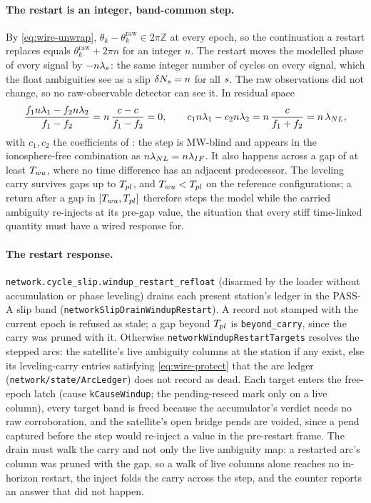 \documentclass[main.tex]{subfiles}
\begin{document}
\paragraph{The restart is an integer, band-common step.}
By \eqref{eq:wire-unwrap}, $\theta_k - \theta^{\mathrm{raw}}_k \in
2\pi\mathbb{Z}$ at every epoch, so the continuation a restart replaces
equals $\theta^{\mathrm{raw}}_k + 2\pi n$ for an integer $n$. The restart
moves the modelled phase of every signal by $-n\lambda_s$: the same
integer number of cycles on every signal, which the float ambiguities see
as a slip $\delta N_s = n$ for all $s$. The raw observations did
not change, so no raw-observable detector can see it. In residual space
\begin{equation}
\frac{f_1 n\lambda_1 - f_2 n\lambda_2}{f_1 - f_2}
= n\,\frac{c - c}{f_1 - f_2} = 0,
\qquad
c_1 n\lambda_1 - c_2 n\lambda_2 = n\,\frac{c}{f_1+f_2} = n\,\lambda_{NL} ,
\label{eq:wire-mw-blind}
\end{equation}
with $c_1, c_2$ the coefficients of : the step is MW-blind and appears in the ionosphere-free
combination as $n\lambda_{NL} = n\lambda_{IF}$. It also happens across a gap of at
least $T_{wu}$, where no time difference has an adjacent
predecessor. The leveling carry survives gaps up to $T_{pl}$, and
$T_{wu} < T_{pl}$ on the reference configurations; a return
after a gap in $[T_{wu}, T_{pl}]$ therefore steps the model
while the carried ambiguity re-injects at its pre-gap value, the situation
that every stiff time-linked quantity must have a wired response for.

\paragraph{The restart response.}
\texttt{network.cycle\_slip.windup\_restart\_refloat} (disarmed by the
loader without accumulation or phase leveling) drains each present
station's ledger in the PASS-A slip band
(\texttt{networkSlipDrainWindupRestart}). A record not stamped with the
current epoch is refused as stale; a gap beyond $T_{pl}$ is
\texttt{beyond\_carry}, since the carry was pruned with it. Otherwise
\texttt{networkWindupRestartTargets} resolves the stepped arcs: the
satellite's live ambiguity columns at the station if any exist, else its
leveling-carry entries satisfying \eqref{eq:wire-protect} that the arc
ledger (\texttt{network/state/ArcLedger}) does not record as dead. Each
target enters the free-epoch latch (cause \texttt{kCauseWindup}; the
pending-reseed mark only on a live column), every target band is freed
because the accumulator's verdict needs no raw corroboration, and the
satellite's open bridge pends are voided, since a pend captured before the
step would re-inject a value in the pre-restart frame. The drain must walk
the carry and not only the live ambiguity map: a restarted arc's column was
pruned with the gap, so a walk of live columns alone reaches no
in-horizon restart, the inject folds the carry across the step, and the
counter reports an answer that did not happen.
\end{document}
